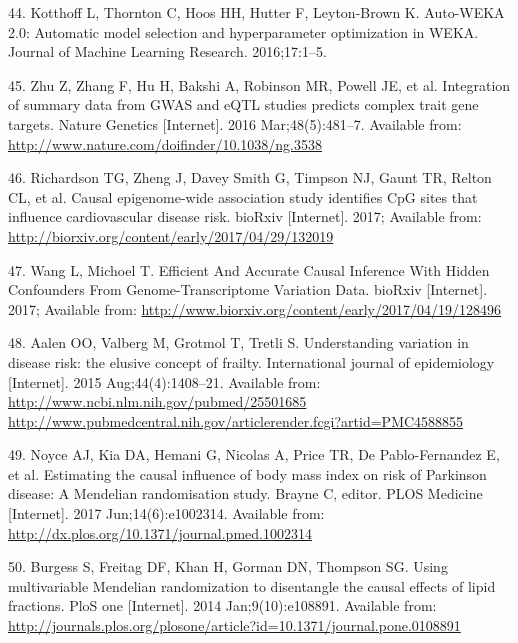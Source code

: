 \documentclass[]{article}
\begin{document}
\hypertarget{ref-kotthoff2016auto}{}
44. Kotthoff L, Thornton C, Hoos HH, Hutter F, Leyton-Brown K. Auto-WEKA
2.0: Automatic model selection and hyperparameter optimization in WEKA.
Journal of Machine Learning Research. 2016;17:1--5.

\hypertarget{ref-Zhu2016}{}
45. Zhu Z, Zhang F, Hu H, Bakshi A, Robinson MR, Powell JE, et al.
Integration of summary data from GWAS and eQTL studies predicts complex
trait gene targets. Nature Genetics {[}Internet{]}. 2016
Mar;48(5):481--7. Available from:
\url{http://www.nature.com/doifinder/10.1038/ng.3538}

\hypertarget{ref-Richardson2017}{}
46. Richardson TG, Zheng J, Davey Smith G, Timpson NJ, Gaunt TR, Relton
CL, et al. Causal epigenome-wide association study identifies CpG sites
that influence cardiovascular disease risk. bioRxiv {[}Internet{]}.
2017; Available from:
\url{http://biorxiv.org/content/early/2017/04/29/132019}

\hypertarget{ref-Wang2017}{}
47. Wang L, Michoel T. Efficient And Accurate Causal Inference With
Hidden Confounders From Genome-Transcriptome Variation Data. bioRxiv
{[}Internet{]}. 2017; Available from:
\url{http://www.biorxiv.org/content/early/2017/04/19/128496}

\hypertarget{ref-Aalen2015}{}
48. Aalen OO, Valberg M, Grotmol T, Tretli S. Understanding variation in
disease risk: the elusive concept of frailty. International journal of
epidemiology {[}Internet{]}. 2015 Aug;44(4):1408--21. Available from:
\href{http://www.ncbi.nlm.nih.gov/pubmed/25501685\%20http://www.pubmedcentral.nih.gov/articlerender.fcgi?artid=PMC4588855}{http://www.ncbi.nlm.nih.gov/pubmed/25501685 http://www.pubmedcentral.nih.gov/articlerender.fcgi?artid=PMC4588855}

\hypertarget{ref-Noyce2017}{}
49. Noyce AJ, Kia DA, Hemani G, Nicolas A, Price TR, De Pablo-Fernandez
E, et al. Estimating the causal influence of body mass index on risk of
Parkinson disease: A Mendelian randomisation study. Brayne C, editor.
PLOS Medicine {[}Internet{]}. 2017 Jun;14(6):e1002314. Available from:
\url{http://dx.plos.org/10.1371/journal.pmed.1002314}

\hypertarget{ref-Burgess2014a}{}
50. Burgess S, Freitag DF, Khan H, Gorman DN, Thompson SG. Using
multivariable Mendelian randomization to disentangle the causal effects
of lipid fractions. PloS one {[}Internet{]}. 2014 Jan;9(10):e108891.
Available from:
\url{http://journals.plos.org/plosone/article?id=10.1371/journal.pone.0108891}
\end{document}
